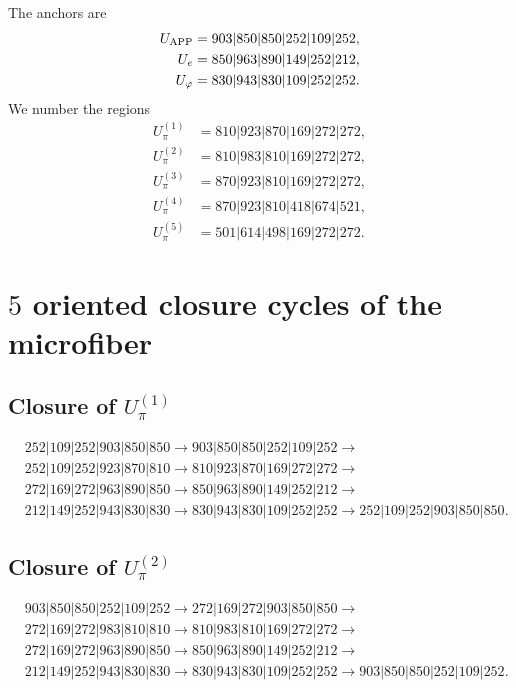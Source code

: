 The anchors are
\[
\begin{aligned}
U_{\rm APP}&=903|850|850|252|109|252,\\
U_e&=850|963|890|149|252|212,\\
U_\varphi&=830|943|830|109|252|252.
\end{aligned}
\]
We number the regions
\[
\begin{aligned}
U_\pi^{(1)}&=810|923|870|169|272|272,\\
U_\pi^{(2)}&=810|983|810|169|272|272,\\
U_\pi^{(3)}&=870|923|810|169|272|272,\\
U_\pi^{(4)}&=870|923|810|418|674|521,\\
U_\pi^{(5)}&=501|614|498|169|272|272.
\end{aligned}
\]

\section{\(5\) oriented closure cycles of the microfiber}

\subsection{Closure of \texorpdfstring{\(U_\pi^{(1)}\)}{U-pi 1}}
\begin{align*}
&252|109|252|903|850|850\to
903|850|850|252|109|252\to\\
&252|109|252|923|870|810\to
810|923|870|169|272|272\to\\
&272|169|272|963|890|850\to
850|963|890|149|252|212\to\\
&212|149|252|943|830|830\to
830|943|830|109|252|252\to
252|109|252|903|850|850.
\end{align*}

\subsection{Closure of \texorpdfstring{\(U_\pi^{(2)}\)}{U-pi 2}}
\begin{align*}
&903|850|850|252|109|252\to
272|169|272|903|850|850\to\\
&272|169|272|983|810|810\to
810|983|810|169|272|272\to\\
&272|169|272|963|890|850\to
850|963|890|149|252|212\to\\
&212|149|252|943|830|830\to
830|943|830|109|252|252\to
903|850|850|252|109|252.
\end{align*}

